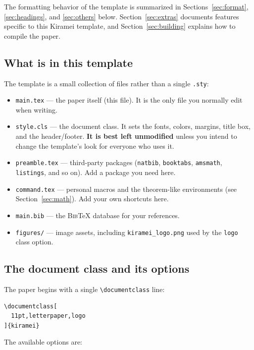\documentclass[11pt,letterpaper,twocolumn]{template/style}
\begin{document}
The formatting behavior of the template is summarized in
Sections~\ref{sec:format}, \ref{sec:headings}, and \ref{sec:others} below.
Section~\ref{sec:extras} documents features specific to this Kiramei template, and
Section~\ref{sec:building} explains how to compile the paper.

\subsection{What is in this template}
\label{sec:files}

The template is a small collection of files rather than a single \verb+.sty+:

{\raggedright
\begin{itemize}
  \item \verb+main.tex+ --- the paper itself (this file). It is the only
    file you normally edit when writing.
  \item \verb+style.cls+ --- the document class. It sets the fonts, colors,
    margins, title box, and the header/footer. \textbf{It is best left unmodified}
    unless you intend to change the template's look for everyone who uses it.
  \item \verb+preamble.tex+ --- third-party packages (\verb+natbib+,
    \verb+booktabs+, \verb+amsmath+, \verb+listings+, and so on). Add a package
    you need here.
  \item \verb+command.tex+ --- personal macros and the theorem-like environments
    (see Section~\ref{sec:math}). Add your own shortcuts here.
  \item \verb+main.bib+ --- the \textsc{Bib}\TeX{} database for your references.
  \item \verb+figures/+ --- image assets, including \verb+kiramei_logo.png+ used by
    the \verb+logo+ class option.
\end{itemize}
\par}

\subsection{The document class and its options}
\label{sec:options}

The paper begins with a single \verb+\documentclass+ line:
\begin{verbatim}
\documentclass[
  11pt,letterpaper,logo
]{kiramei}
\end{verbatim}
The available options are:
\end{document}
